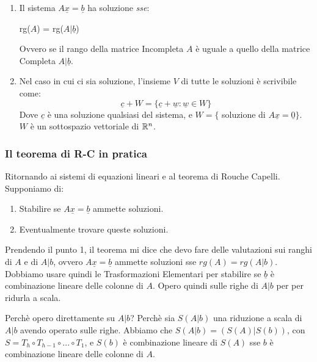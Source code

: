 \begin{enumerate}
	\item Il sistema $A\underline{x}=\underline{b}$ ha soluzione \emph{sse}:
	      \begin{center}
		      rg($A$) = rg($A|\underline{b}$)
	      \end{center}
	      Ovvero se il rango della matrice Incompleta $A$ è uguale a quello della matrice Completa $A|\underline{b}$.
	\item Nel caso in cui ci sia soluzione, l'insieme $V$ di tutte le soluzioni è scrivibile come:
	      \[ \underline{c} + W = \{ \underline{c} + \underline{w} : \underline{w} \in W\} \]
	      Dove $\underline{c}$ è una soluzione qualsiasi del sistema, e $W= \{$ soluzione di $A\underline{x} = \underline{0} \}$.
	      $W$ è un sottospazio vettoriale di $\mathbb{R}^n$.
\end{enumerate}

\subsubsection{Il teorema di R-C in pratica}
Ritornando ai sistemi di equazioni lineari e al teorema di Rouche Capelli.
Supponiamo di:
\begin{enumerate}
	\item Stabilire se $A\underline{x} =\underline{b}$ ammette soluzioni.
	\item Eventualmente trovare queste soluzioni.
\end{enumerate}

Prendendo il punto 1, il teorema mi dice che devo fare delle valutazioni sui ranghi di $A$ e di $A|b$, ovvero 
$A\underline{x} =\underline{b}$ ammette soluzioni sse $rg(A) = rg(A|b)$.
Dobbiamo usare quindi le Trasformazioni Elementari per stabilire se $\underline{b}$ è combinazione lineare delle colonne di $A$.
Opero quindi sulle righe di $A|b$ per per ridurla a scala.

Perchè opero direttamente su $A|b$? Perchè sia $S(A|b)$ una riduzione a scala di $A|b$ avendo operato sulle righe.
Abbiamo che $S(A|b) = (S(A) | S(b))$, con $S= T_h \circ T_{h-1} \circ ... \circ T_1$, e $S(b)$ è combinazione lineare di $S(A)$ sse 
$b$ è combinazione lineare delle colonne di $A$. 


